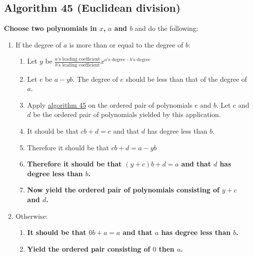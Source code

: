 \documentclass[twocolumn]{article}
\begin{document}
		\subsection{Algorithm 45 (Euclidean division)}\label{sec:algorithm 45}
			\textbf{Choose two polynomials in $x$, $a$ and $b$} and do the following:
			\begin{enumerate}
				\item If the degree of $a$ is more than or equal to the degree of $b$:
				\begin{enumerate}
					\item Let $y$ be $\frac{\text{$a$'s leading coefficient}}{\text{$b$'s leading coefficient}}x^{\text{$a$'s degree - $b$'s degree}}$
					\item Let $e$ be $a-yb$. The degree of $e$ should be less than that of the degree of $a$.
					\item Apply \hyperref[sec:algorithm 45]{algorithm 45} on the ordered pair of polynomials $e$ and $b$. Let $c$ and $d$ be the ordered pair of polynomials yielded by this application.
					\item It should be that $cb+d=e$ and that $d$ has degree less than $b$.
					\item Therefore it should be that $cb+d=a-yb$
					\item \textbf{Therefore it should be that $(y+c)b+d=a$ and that $d$ has degree less than $b$.}
					\item \textbf{Now yield the ordered pair of polynomials consisting of $y+c$  and $d$.}
				\end{enumerate}
				\item Otherwise:
				\begin{enumerate}
					\item \textbf{It should be that $0b+a=a$ and that $a$ has degree less than $b$.}
					\item \textbf{Yield the ordered pair consisting of $0$ then $a$.}
				\end{enumerate}
			\end{enumerate}
\end{document}
